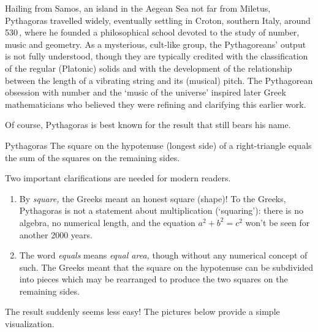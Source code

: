 Hailing from Samos, an island in the Aegean Sea not far from Miletus, Pythagoras travelled widely, eventually settling in Croton, southern Italy, around 530\,\BC{}, where he founded a philosophical school devoted to the study of number, music and geometry. As a mysterious, cult-like group, the Pythagoreans' output is not fully understood, though they are typically credited with the classification of the regular (Platonic) solids and with the development of the relationship between the length of a vibrating string and its (musical) pitch. The Pythagorean obsession with number and the `music of the universe' inspired later Greek mathematicians who believed they were refining and clarifying this earlier work.
\smallbreak

Of course, Pythagoras is best known for the result that still bears his name.

\begin{thm}{Pythagoras}{}
	The square on the hypotenuse (longest side) of a right-triangle equals the sum of the squares on the remaining sides.
\end{thm}

Two important clarifications are needed for modern readers.
\begin{enumerate}
  \item By \emph{square,} the Greeks meant an honest square (shape)! To the Greeks, Pythagoras is not a statement about multiplication (`squaring'): there is no algebra, no numerical length, and the equation $a^2+b^2=c^2$ won't be seen for another 2000 years.
  \item The word \emph{equals} means \emph{equal area,} though without any numerical concept of such. The Greeks meant that the square on the hypotenuse can be subdivided into pieces which may be rearranged to produce the two squares on the remaining sides.
\end{enumerate}

The result suddenly seems less easy! The pictures below provide a simple visualization.

